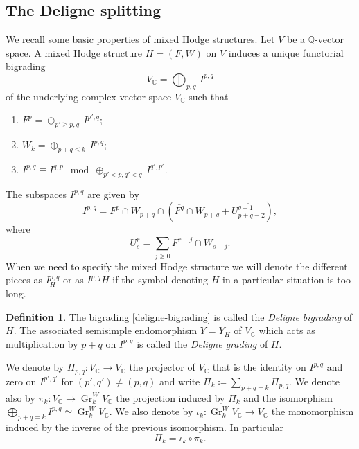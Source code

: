 \documentclass[11pt,a4paper]{amsart}
\newcommand{\C}{\mathds{C}}
\newcommand{\Q}{\mathds{Q}}
\DeclareMathOperator {\Gr} {Gr}
\numberwithin{equation}{section}
\theoremstyle{plain}
\theoremstyle{definition}
\newtheorem{df}[prop]{Definition}
\begin{document}
\subsection{The Deligne splitting}
\label{sec:deligne-splitting}
We recall some  basic properties of mixed Hodge structures.
Let $V$ be a $\Q$-vector space. 
A mixed Hodge structure $H=(F,W)$ on $V$ induces a unique functorial bigrading
\cite[Theorem 2.13]{CKS:dhs}
\begin{equation}
    V_{\C } = \bigoplus_{p,q}\, I^{p,q}     \label{deligne-bigrading}
\end{equation}  
of the underlying complex vector space $V_{\C }$ such that
\begin{enumerate}
\item $F^p= \oplus_{p'\geq p,q}\, I^{p',q}$;
\item $W_k = \oplus_{p+q \leq k}\, I^{p,q}$;
\item $\overline{I^{p,q}}
  \equiv I^{q,p} \mod\oplus_{p'<p,q'<q}\, I^{q',p'}$.
\end{enumerate}
The subspaces $I^{p,q}$ are given by
\begin{equation}
  \label{eq:72}
  I^{p,q}=F^{p}\cap W_{p+q}\cap \left(\overline{F^{q}}\cap W_{p+q} +
    \overline{U^{q-1}_{p+q-2}}\right), 
\end{equation}
where
\begin{displaymath}
  U^{r}_{s}=\sum_{j\ge 0} F^{r-j}\cap W_{s-j}.
\end{displaymath}
When we need to specify the mixed Hodge structure we will denote the
different pieces as $I^{p,q}_{H}$ or as $I^{p,q}H$ if the symbol
denoting $H$ in a particular situation is too long. 
\begin{df}
The bigrading \eqref{deligne-bigrading} is called the
\emph{Deligne bigrading} of $H$. The associated semisimple endomorphism
$Y = Y_{H}$ of $V_{\C }$ which acts as multiplication by $p+q$ on
$I^{p,q}$ is called the \emph{Deligne grading} of $H$.  
\end{df}
 We denote by $\Pi _{p,q}\colon V_\C \to  V_\C$ the projector of $V_{\C}$ that is the
 identity on $I^{p,q}$ and zero on $I^{p',q'}$ for $(p',q')\not =
 (p,q)$ and write $\Pi _{k}\coloneqq\sum_{p+q=k}\Pi _{p,q}$. We denote also by
 $\pi _{k}\colon V_{\C}\to \Gr^{W}_{k}V_{\C}$ the projection induced
 by $\Pi _{k}$ and the isomorphism $\bigoplus _{p+q=k}I^{p,q}\simeq
 \Gr^{W}_{k}V_{\C}$.  We also denote by $\iota_{k}\colon
 \Gr^{W}_{k}V_{\C}\to V_{\C}$ the monomorphism induced by the inverse of
 the previous isomorphism. In particular
 \begin{displaymath}
   \Pi _{k}=\iota_{k}\circ \pi _{k}.
 \end{displaymath}
\end{document}
